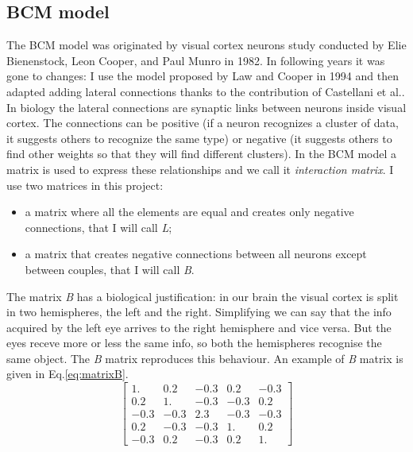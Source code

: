\documentclass[a4paper,12pt]{article}
\begin{document}
\subsection{BCM model}
The BCM model was originated by visual cortex neurons study conducted by Elie Bienenstock, Leon Cooper, and Paul Munro in 1982\cite{BCM:1982}.
In following years it was gone to changes: I use the model proposed by Law and Cooper in 1994\cite{law:1994} and then adapted adding lateral connections thanks to the contribution of Castellani et al.\cite{castellani:1998}.
In biology the lateral connections are synaptic links between neurons inside visual cortex.
The connections can be positive (if a neuron recognizes a cluster of data, it suggests others to recognize the same type) or negative (it suggests  others to find other weights so that they will find different clusters).
In the BCM model a matrix is used to express these relationships and we call it \emph{interaction matrix}\cite{cooper:1988}.
I use two matrices in this project:
\begin{itemize}
\item a matrix where all the elements are equal and creates only negative connections, that I will call \emph{L};
\item a matrix that creates negative connections between all neurons except between couples, that I will call \emph{B}.
\end{itemize}
The matrix \emph{B} has a biological justification: in our brain the visual cortex is split in two hemispheres, the left and the right.
Simplifying we can say that the info acquired by the left eye arrives to the right hemisphere and vice versa.
But the eyes receve more or less the same info, so both the hemispheres recognise the same object.
The \emph{B} matrix reproduces this behaviour\cite{berselli:2023}.
An example of \emph{B} matrix is given in Eq.\ref{eq:matrixB}.
\begin{equation}\label{eq:matrixB}
  \begin{bmatrix}
    1. &  0.2 & -0.3 & 0.2 & -0.3 \\
    0.2 & 1. & -0.3 & -0.3 & 0.2 \\
    -0.3 & -0.3 & 2.3 & -0.3 & -0.3 \\
    0.2 & -0.3 & -0.3 & 1. & 0.2 \\
    -0.3 & 0.2 & -0.3 & 0.2 & 1.
  \end{bmatrix}
\end{equation}
\end{document}
